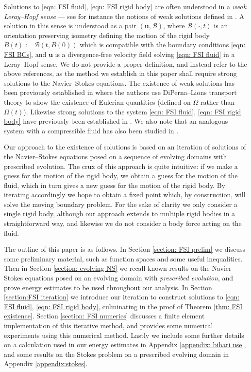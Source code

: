 \documentclass[a4paper]{amsart}
\numberwithin{equation}{section}
\theoremstyle{plain}
\newcommand{\mbf}[1]{\mathbf{#1}}
\begin{document}
Solutions to \eqref{eqn: FSI fluid}, \eqref{eqn: FSI rigid body} are often understood in a \emph{weak Leray--Hopf sense} --- see for instance the notions of weak solutions defined in \cite{al2018strong,vcanic2021moving,chemetov2017motion,chemetov2019weak}.
A solution in this sense is understood as a pair $(\mbf{u}, \mathscr{B})$, where $\mathscr{B}(\cdot,t)$ is an orientation preserving isometry defining the motion of the rigid body $B(t) := \mathscr{B}(t,B(0))$ which is compatible with the boundary conditions \eqref{eqn: FSI BCs}, and $\mbf{u}$ is a divergence-free velocity field solving \eqref{eqn: FSI fluid} in a Leray--Hopf sense.
We do not provide a proper definition, and instead refer to the above references, as the method we establish in this paper shall require strong solutions to the Navier--Stokes equations.
The existence of weak solutions has been previously established in \cite{desjardins1999existence} where the authors use DiPerna--Lions transport theory \cite{diperna1989ordinary} to show the existence of Eulerian quantities (defined on $\Omega$ rather than $\Omega(t)$).
Likewise strong solutions to the system \eqref{eqn: FSI fluid}, \eqref{eqn: FSI rigid body} have previously been established in \cite{geissert2013Lp,grandmont2000existence, takahashi2003analysis}.
We also note that an analogous system with a compressible fluid has also been studied in \cite{desjardins2000weak,feireisl2003motion,Hieber2015Compressible,Necasova2022Compressible}. 

Our approach to the existence of solutions is based on an iteration of solutions of the Navier--Stokes equations posed on a sequence of evolving domains with prescribed evolution.
The crux of this approach is quite intuitive: if we make a guess for the motion of the rigid body, we obtain a guess for the motion of the fluid, which in turn gives a new guess for the motion of the rigid body.
By iterating accordingly we hope to obtain a fixed point which, by construction, will solve the moving boundary problem.
For the sake of clarity we only consider a single rigid body, although our approach extends to multiple rigid bodies in a straightforward way, and likewise we do not consider a body force acting on the fluid.

The outline of this paper is as follows.
In Section \ref{section: FSI prelim} we discuss some preliminary material, such as function spaces and some useful inequalities.
Then in Section \ref{section: evolving NS} we recall known results on the Navier--Stokes equations posed on an evolving domain with \emph{prescribed evolution}, and prove energy estimates to be used throughout our analysis.
In Section \ref{section:FSI iteration} we introduce our iteration to construct solutions to \eqref{eqn: FSI fluid}, \eqref{eqn: FSI rigid body}, culminating in the proof of Theorem \ref{thm: FSI existence}.
Section \ref{section: FSI numerics} discusses a finite element implementation of this iterative method, and provides some numerical experiments using this numerical method.
Lastly we include some further details on a calculation used in our energy estimates in Appendix \ref{appendix: bihari use}, and some results on the Stokes problem on a prescribed evolving domain in Appendix \ref{appendix:stokes}.
\end{document}
